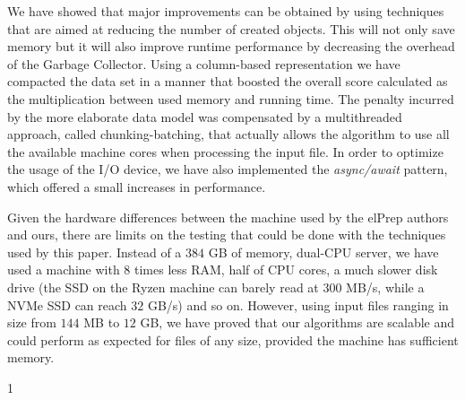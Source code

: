 \documentclass[a4paper,twoside]{article}
\begin{document}
We have showed that major improvements can be obtained by using techniques that are aimed at reducing the number of created objects. This will not only save memory but it will also improve runtime performance by decreasing the overhead of the Garbage Collector.
Using a column-based representation we have compacted the data set in a manner that boosted the overall score calculated as the multiplication between used memory and running time. 
The penalty incurred by the more elaborate data model was compensated by a multithreaded approach, called chunking-batching, that actually allows the algorithm to use all the available machine cores when processing the input file. In order to optimize the usage of the I/O device, we have also implemented the {\it async/await} pattern, which offered a small increases in performance.

Given the hardware differences between the machine used by the elPrep authors and ours, there are limits on the testing that could be done with the techniques used by this paper.
Instead of a $384$ GB of memory, dual-CPU server, we have used a machine  with $8$ times less RAM, half of CPU cores, a much slower disk drive (the SSD on the Ryzen machine can barely read at 300 MB/s, while a NVMe SSD can reach $32$ GB/s) and so on.
However, using input files ranging in size from $144$ MB to $12$ GB, we have proved that our algorithms are scalable and could perform as expected for files of any size, provided the machine has sufficient memory.

1









{\small
}
\end{document}
